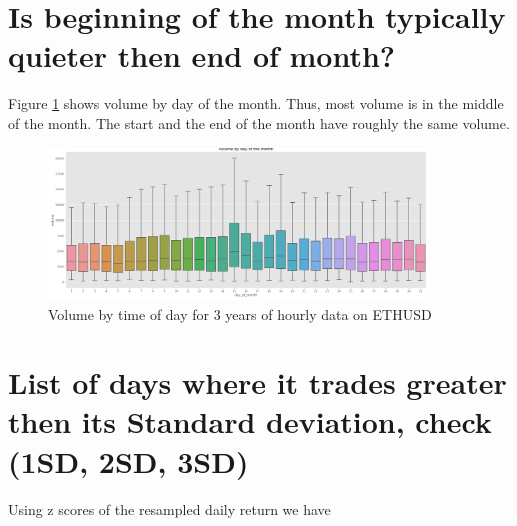 \section{ Is beginning of the month typically quieter then end of month?}
Figure \ref{fig:qt} shows volume by day of the month. Thus, most volume is in the middle of the month. The start and the end of the month have roughly the same volume.
\begin{figure}
\center
\includegraphics[width=0.9\textwidth]{fig/qt.png}
\caption{Volume by time of day for 3 years of hourly data on ETHUSD}
\label{fig:qt}
\end{figure}

\section{ List of days where it trades greater then its Standard deviation, check (1SD, 2SD, 3SD)}
Using z scores of the resampled daily return we have

